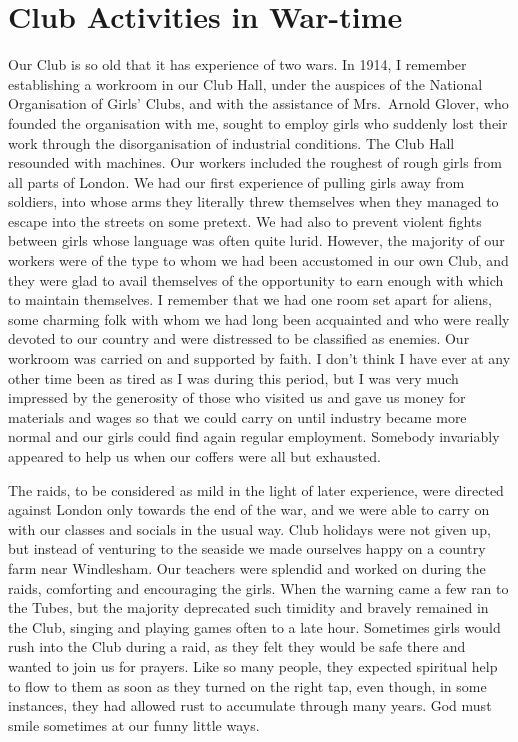 \chapter{Club Activities in War-time}

Our Club is so old that it has experience of two wars. In
1914, I remember establishing a workroom in our Club
Hall, under the auspices of the National Organisation of
Girls’ Clubs, and with the assistance of Mrs.\ Arnold
Glover, who founded the organisation with me, sought
to employ girls who suddenly lost their work through the
disorganisation of industrial conditions. The Club Hall
resounded with machines. Our workers included the
roughest of rough girls from all parts of London. We had
our first experience of pulling girls away from soldiers,
into whose arms they literally threw themselves when
they managed to escape into the streets on some pretext.
We had also to prevent violent fights between girls whose
language was often quite lurid. However, the majority
of our workers were of the type to whom we had been
accustomed in our own Club, and they were glad to avail
themselves of the opportunity to earn enough with which
to maintain themselves. I remember that we had one
room set apart for aliens, some charming folk with whom
we had long been acquainted and who were really devoted
to our country and were distressed to be classified as
enemies. Our workroom was carried on and supported
by faith. I don’t think I have ever at any other time been
as tired as I was during this period, but I was very much
impressed by the generosity of those who visited us and
gave us money for materials and wages so that we could
carry on until industry became more normal and our girls
could find again regular employment. Somebody invariably
appeared to help us when our coffers were all but
exhausted.

The raids, to be considered as mild in the light of later
experience, were directed against London only towards
the end of the war, and we were able to carry on with
our classes and socials in the usual way. Club holidays
were not given up, but instead of venturing to the seaside
we made ourselves happy on a country farm near
Windlesham. Our teachers were splendid and worked
on during the raids, comforting and encouraging the girls.
When the warning came a few ran to the Tubes, but the
majority deprecated such timidity and bravely remained
in the Club, singing and playing games often to a late
hour. Sometimes girls would rush into the Club during
a raid, as they felt they would be safe there and wanted
to join us for prayers. Like so many people, they expected
spiritual help to flow to them as soon as they turned on
the right tap, even though, in some instances, they had
allowed rust to accumulate through many years. God
must smile sometimes at our funny little ways.


